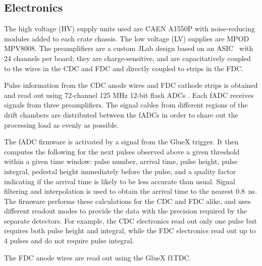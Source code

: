 \subsection{Electronics \label{sec:dcelectronics}}
The high voltage (HV) supply units used are CAEN A1550P with noise-reducing modules added to each crate chassis. 
The low voltage (LV) supplies are MPOD MPV8008. 
The preamplifiers are a custom JLab design based on an ASIC~\cite{hdnote923,hdnote1001}
with 24 channels per board; they are charge-sensitive, and are capacitatively coupled to the wires in the CDC and FDC and directly coupled to strips in the FDC. 

Pulse information from the CDC anode wires and FDC cathode strips is obtained and read out using 72-channel 125 MHz 12-bit flash ADCs \cite{Visser2008,5873864}. 
Each fADC receives signals from three preamplifiers. 
The signal cables from different regions of the drift chambers are distributed between the fADCs in order to share out the processing load as evenly as possible.  

The fADC firmware is activated by a signal from the GlueX trigger. It then computes the following for the next pulses observed above a given threshold within a given time window: pulse number, arrival time, pulse height, pulse integral, pedestal height immediately before the pulse, and a quality factor indicating if the arrival time is likely to be less accurate than usual. 
Signal filtering and interpolation is used to obtain the arrival time to the nearest 0.8~ns. 
The firmware performs these calculations for the CDC and FDC alike, and uses different readout modes to provide the data with the precision required by the separate detectors. 
For example, the CDC electronics read out only one pulse but requires both pulse height and integral, while the FDC electronics read out up to 4 pulses and do not require pulse integral.  


The FDC anode wires are read out using the GlueX f1TDC\cite{JLAB2002}. 



